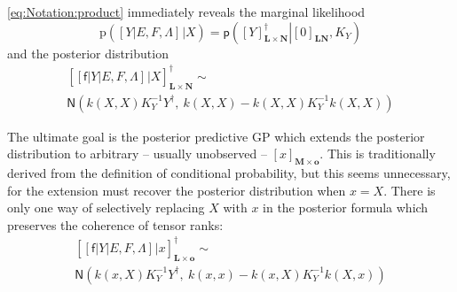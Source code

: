 \documentclass[preprint,12pt]{elsarticle}
\newcommand*{\M}[1]{\ensuremath{#1}\xspace}
\newcommand*{\x}{\times}
\newcommand*{\mi}[1]{\mathbf{#1}}
\newcommand*{\rv}[1]{\mathsf{#1}}
\newcommand*{\te}[2][]{\left\lbrack{#2}\right\rbrack_{#1}}
\newcommand*{\prob}[3]{\M{\mathsf{p}\!\left(\left.{#1}\right\vert{#2,#3}\right)}}
\newcommand*{\gauss}[2]{\mathsf{N}\!\left({#1,#2}\right)}
\begin{document}
        \cref{eq:Notation:product} immediately reveals the marginal likelihood
        \begin{equation} \label{eq:GP:marginalLikelihood}
            \mathrm{p}\!\left(\te{Y \vert E,F,\Lambda} \big\vert X\right)
            = \prob{\te[\mi{L\x N}]{Y}^{\dagger}}{\te[\mi{LN}]{0}}{K_Y}
        \end{equation}
        and the posterior distribution
        \begin{multline*}
            \te[\mi{L\x N}]{\te{\rv{f} \vert Y \vert E,F,\Lambda} \big\vert X}^{\dagger} \sim \\
            \gauss{k(X,X) K_{Y}^{-1} Y^{\dagger}}{\ k(X,X) - k(X,X) K_{Y}^{-1} k(X,X)}
        \end{multline*}

        The ultimate goal is the posterior predictive GP which extends the posterior distribution to arbitrary -- usually unobserved -- $\te[\mi{M}\x\mi{o}]{x}$. This is traditionally derived from the definition of conditional probability, but this seems unnecessary, for the extension must recover the posterior distribution when $x=X$. There is only one way of selectively replacing $X$ with $x$ in the posterior formula which preserves the coherence of tensor ranks:
        \begin{multline} \label{def:GP:Predictive}
            \te[\mi{L\x o}]{\te{\rv{f} \vert Y \vert E,F,\Lambda} \big\vert x}^{\dagger} \sim \\
            \gauss{k(x,X) K_{Y}^{-1} Y^{\dagger}}{\ k(x,x) - k(x,X) K_{Y}^{-1} k(X,x)}
        \end{multline}
\end{document}
